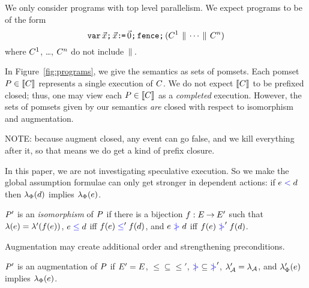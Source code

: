 We only consider programs with top level parallelism.   We expect programs to
be of the form
\begin{displaymath}
  \texttt{var}\,\vec{x}\texttt{;}\,
  \vec{x}\texttt{:}\mkern-1mu\texttt{=}\,\vec{0}\texttt{;}\,
  \texttt{fence}\texttt{;}\,
  (C^1 \,\mathbin{\|}\, \cdots \,\mathbin{\|}\, C^n)
\end{displaymath}
where $C^1$, \ldots, $C^n$ do not include $\,\mathbin{\|}\,$.

In Figure~\ref{fig:programs}, we give the semantics as sets of pomsets.  
Each pomset
$P\in\llbracket C\rrbracket$ represents a single execution of $C$.  We do not
expect $\llbracket C\rrbracket$ to be prefixed closed; thus, one may view each
$P\in\llbracket C\rrbracket$ as a \emph{completed} execution.  However, the sets of
pomsets given by our semantics \emph{are} closed with respect to
isomorphism and augmentation.

NOTE: because augment closed, any event can go false, and we kill everything
after it, so that means we do get a kind of prefix closure.

In this paper, we are not investigating speculative execution.  So we make
the global assumption formulae can only get stronger in dependent actions:
if $e\mathrel{{\color{blue}<}}d$ then
$\lambda_{\Phi}(d)$ implies $\lambda_{\Phi}(e)$.
 
\begin{definition}
  $P'$ is an \emph{isomorphism} of $P$ if there is a bijection
  $f:E\mathbin\rightarrow E'$ such that
  $\lambda(e)=\lambda'(f(e))$,
  $e\mathrel{{\color{blue}\leq}}d$ iff $f(e)\mathrel{{\color{blue}\leq}}'f(d)$, and
  $e\mathrel{{\color{blue}\mkern4mu\mid\!\!\!>}}d$ iff $f(e)\mathrel{{\color{blue}\mkern4mu\mid\!\!\!>}}'f(d)$.
\end{definition}
Augmentation may create additional order and strengthening
preconditions.
\begin{definition}
  $P'$ is an augmentation of $P$ if $E'=E$,
  ${\le}\subseteq{\le'}$, %
  ${\mathrel{{\color{blue}\mkern4mu\mid\!\!\!>}}}\subseteq{\mathrel{{\color{blue}\mkern4mu\mid\!\!\!>}}'}$, %
  $\lambda_{\mathcal{A}}'=\lambda_{\mathcal{A}}$, and %
  $\lambda_{\Phi}'(e)$ implies $\lambda_{\Phi}(e)$.
\end{definition}

